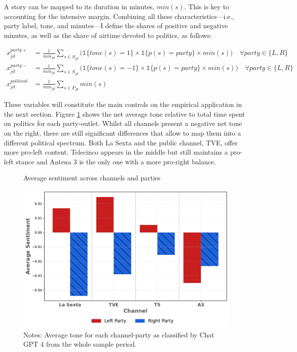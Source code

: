 \documentclass[12pt]{article}
\begin{document}
	A story can be mapped to its duration in minutes, $min(s)$. This is key to accounting for the intensive margin. Combining all these characteristics—i.e., party label, tone, and minutes—I define the shares of positive and negative minutes, as well as the share of airtime devoted to politics, as follows:
	
	


		\begin{equation}\label{eq:controls}
		\begin{aligned}
			x_{jd}^{party+}&= \frac{1}{min_{jd}} \sum_{s \in S_{jd}}\bigg(\mathds{1}\{tone(s)=1\} \times \mathds{1}\{p(s)=party\}\times min(s) \bigg) \quad \forall party \in \{L,R\} \\
			x_{jd}^{party-}&= \frac{1}{min_{jd}} \sum_{s \in S_{jd}}\bigg( \mathds{1}\{tone(s)=-1\} \times \mathds{1}\{p(s)=party\} \times min(s)\bigg) \quad \forall party \in \{L,R\} \\
			x_{jd}^{political}&=\frac{1}{min_{jd}} \sum_{s \in P_{jd}}min(s) 
		\end{aligned}
	\end{equation} 
	
	These variables will constitute the main controls on the empirical application in the next section.  Figure \ref{fig:chat} shows the net average tone relative to total time spent on politics  for each party-outlet. Whilst all channels present a negative net tone on the right, there are still significant differences that allow to map them into a different political spectrum. Both La Sexta and the public channel, TVE, offer more pro-left content. Telecinco appears in the middle but still maintains a pro-left stance and Antena 3 is the only one with a more pro-right balance. 	 
	
	

	
	\begin{figure}[ht!]
		\caption{Average sentiment across channels and parties}
		\centering
		\includegraphics[width=120mm]{figures/chatgpt}
		\caption*{\small Notes: Average tone for each channel-party as classified by Chat GPT 4 from the whole sample period. }
		\label{fig:chat}
	\end{figure}
	
\end{document}
